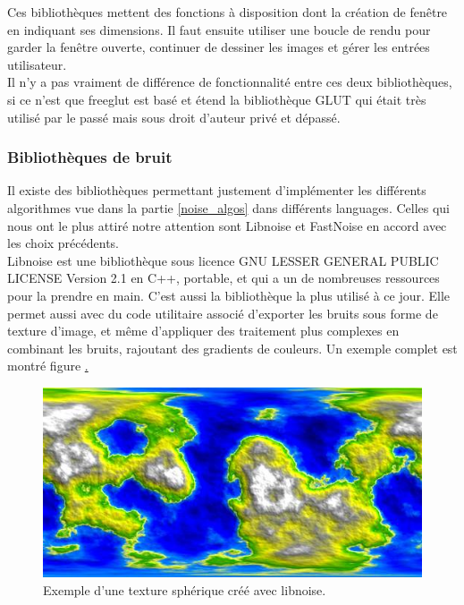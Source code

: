 \documentclass[a4paper]{article}
\begin{document}
    Ces bibliothèques mettent des fonctions à disposition dont la création de fenêtre en indiquant ses dimensions. Il faut ensuite utiliser une boucle de rendu pour garder la fenêtre ouverte, continuer de dessiner les images et gérer les entrées utilisateur.\\
    
    Il n'y a pas vraiment de différence de fonctionnalité entre ces deux bibliothèques, si ce n'est que freeglut est basé et étend la bibliothèque GLUT qui était très utilisé par le passé mais sous droit d'auteur privé et dépassé.

      
 \subsubsection{Bibliothèques de bruit}
    
    Il existe des bibliothèques permettant justement d'implémenter les différents algorithmes vue dans la partie \ref{noise_algos} dans différents languages.
    Celles qui nous ont le plus attiré notre attention sont Libnoise \cite{LibNoise} et FastNoise \cite{FastNoise} en accord avec les choix précédents.\\

    Libnoise est une bibliothèque sous licence GNU LESSER GENERAL PUBLIC LICENSE Version 2.1 en C++, portable, et qui a un de nombreuses ressources pour la prendre en main. C'est aussi la bibliothèque la plus utilisé à ce jour. Elle permet aussi avec du code utilitaire associé d'exporter les bruits sous forme de texture d'image, et même d'appliquer des traitement plus complexes en combinant les bruits, rajoutant des gradients de couleurs. Un exemple complet est montré figure \href{libnoiseExample}.\\
    
    \begin{figure}[!h]
        \begin{center} \includegraphics[width=0.8\linewidth]{img/noise/libnoise_sphericalheightmap.jpg} \end{center}
        \caption{\label{libnoiseExample}Exemple d'une texture sphérique créé avec libnoise\protect\footnotemark .}
        \end{figure}
    
\end{document}
